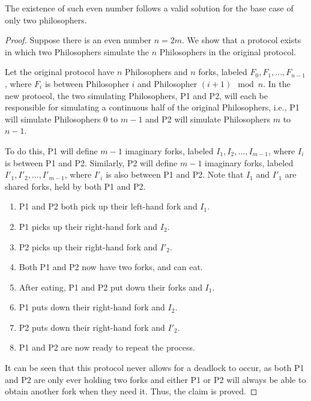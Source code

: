 \documentclass[manuscript,screen,review]{acmart}
\begin{document}
\begin{claim} 
  The existence of such even number follows a valid solution for the base case of only two philosophers.
\end{claim}
\begin{proof}
Suppose there is an even number $n = 2m$. We show that a protocol exists in which two Philosophers simulate the $n$ Philosophers in the original protocol.

Let the original protocol have $n$ Philosophers and $n$ forks, labeled $F_0, F_1, ..., F_{n-1}$, where $F_i$ is between Philosopher $i$ and Philosopher $(i+1) \mod n$. In the new protocol, the two simulating Philosophers, P1 and P2, will each be responsible for simulating a continuous half of the original Philosophers, i.e., P1 will simulate Philosophers $0$ to $m-1$ and P2 will simulate Philosophers $m$ to $n-1$. 

To do this, P1 will define $m-1$ imaginary forks, labeled $I_1, I_2, ..., I_{m-1}$, where $I_i$ is between P1 and P2. Similarly, P2 will define $m-1$ imaginary forks, labeled $I'_1, I'_2, ..., I'_{m-1}$, where $I'_i$ is also between P1 and P2. Note that $I_1$ and $I'_1$ are shared forks, held by both P1 and P2.
\begin{enumerate}
The protocol for P1 and P2 to simulate the original $n$ Philosophers is as follows:
\item P1 and P2 both pick up their left-hand fork and $I_1$.
\item P1 picks up their right-hand fork and $I_2$.
\item P2 picks up their right-hand fork and $I'_2$.
\item Both P1 and P2 now have two forks, and can eat.
\item After eating, P1 and P2 put down their forks and $I_1$.
\item P1 puts down their right-hand fork and $I_2$.
\item P2 puts down their right-hand fork and $I'_2$.
\item P1 and P2 are now ready to repeat the process.
\end{enumerate}
It can be seen that this protocol never allows for a deadlock to occur, as both P1 and P2 are only ever holding two forks and either P1 or P2 will always be able to obtain another fork when they need it. Thus, the claim is proved.

\end{proof}




% 
\printbibliography
\end{document}
